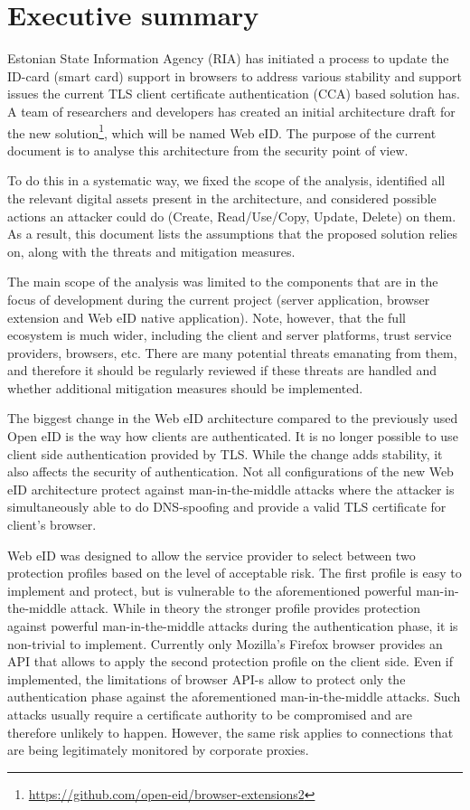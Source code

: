 \chapter{Executive summary}
Estonian State Information Agency (RIA) has initiated a process to update the ID-card (smart card) support in browsers to address various stability and support issues the current TLS client certificate authentication (CCA) based solution has. A team of researchers and developers has created an initial architecture draft for the new solution\footnote{\url{https://github.com/open-eid/browser-extensions2}}, which will be named Web eID. The purpose of the current document is to analyse this architecture from the security point of view.

To do this in a systematic way, we fixed the scope of the analysis, identified all the relevant digital assets present in the architecture, and considered possible actions an attacker could do (Create, Read/Use/Copy, Update, Delete) on them. As a result, this document lists the assumptions that the proposed solution relies on, along with the threats and mitigation measures.

The main scope of the analysis was limited to the components that are in the focus of development during the current project (server application, browser extension and Web eID native application). Note, however, that the full ecosystem is much wider, including the client and server platforms, trust service providers, browsers, etc. There are many potential threats emanating from them, and therefore it should be regularly reviewed if these threats are handled and whether additional mitigation measures should be implemented. 

The biggest change in the Web eID architecture compared to the previously used Open eID is the way how clients are authenticated. It is no longer possible to use client side authentication provided by TLS. While the change adds stability, it also affects the security of authentication. Not all configurations of the new Web eID architecture protect against man-in-the-middle attacks where the attacker is simultaneously able to do DNS-spoofing and provide a valid TLS certificate for client's browser.

Web eID was designed to allow the service provider to select between two protection profiles based on the level of acceptable risk. The first profile is easy to implement and protect, but is vulnerable to the aforementioned powerful man-in-the-middle attack. While in theory the stronger profile provides protection against powerful man-in-the-middle attacks during the authentication phase, it is non-trivial to implement. Currently only Mozilla's Firefox browser provides an API that allows to apply the second protection profile on the client side. Even if implemented, the limitations of browser API-s allow to protect only the authentication phase against the aforementioned man-in-the-middle attacks. Such attacks usually require a certificate authority to be compromised and are therefore unlikely to happen. However, the same risk applies to connections that are being legitimately monitored by corporate proxies.

